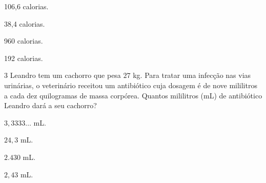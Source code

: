 \begin{escolha}[itemsep=0pt]
\item 106,6 calorias.
\item 38,4 calorias.
\item 960 calorias.
\item 192 calorias.
\end{escolha}











\num{3} Leandro tem um cachorro que pesa $27$ kg. Para
tratar uma infecção nas vias urinárias, o veterinário receitou um
antibiótico cuja dosagem é de nove mililitros a cada dez quilogramas de massa corpórea.
Quantos mililitros (mL) de antibiótico Leandro dará a seu cachorro?

\begin{escolha}[itemsep=0pt]
\item $3,3333\ldots$ mL.
\item $24,3$ mL.
\item $2.430$ mL.
\item $2,43$ mL.
\end{escolha}


